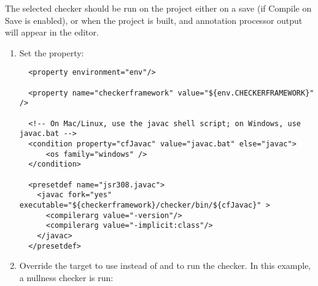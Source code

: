 The selected checker should be run on the project either on a save (if
Compile on Save is enabled), or when the project is built, and
annotation processor output will appear in the editor.



\begin{enumerate}
\item
Set the  property:

\begin{smaller}
\begin{Verbatim}
  <property environment="env"/>

  <property name="checkerframework" value="${env.CHECKERFRAMEWORK}" />

  <!-- On Mac/Linux, use the javac shell script; on Windows, use javac.bat -->
  <condition property="cfJavac" value="javac.bat" else="javac">
      <os family="windows" />
  </condition>

  <presetdef name="jsr308.javac">
    <javac fork="yes" executable="${checkerframework}/checker/bin/${cfJavac}" >
      <compilerarg value="-version"/>
      <compilerarg value="-implicit:class"/>
    </javac>
  </presetdef>
\end{Verbatim}
\end{smaller}

\item
Override the  target to
use  instead of  and to run the checker.
In this example, a nullness checker is run:


\end{enumerate}
